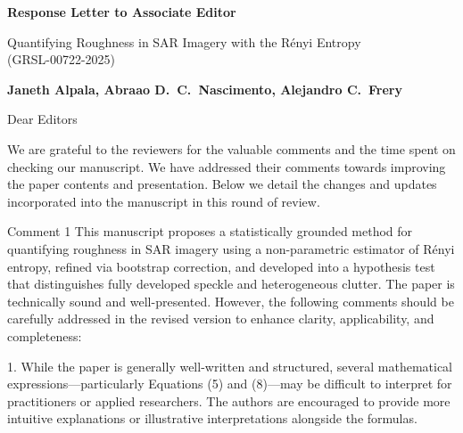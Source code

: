 \documentclass[11pt]{report}
\begin{document}
\begin{center}
\large{\textbf{Response Letter to Associate Editor}}

\vglue 0.3cm

\huge{ Quantifying Roughness in SAR Imagery with the Rényi Entropy\\ (GRSL-00722-2025)}
\end{center}

\begin{center}
\textbf{Janeth Alpala,   Abraao D.\ C.\ Nascimento, Alejandro C.\ Frery }
\end{center}

\date{\today}



\vspace{0.5cm}
\noindent Dear Editors
\bigskip

\noindent We are grateful to the reviewers for the valuable comments and the time spent on checking our manuscript. 
We have addressed their comments towards improving the paper contents and presentation. 
Below we detail the changes and updates incorporated into the manuscript in this round of review.

\medskip


\begin{reviewbox}{Comment 1}
This manuscript proposes a statistically grounded method for quantifying roughness in SAR imagery using a non-parametric estimator of Rényi entropy, refined via bootstrap correction, and developed into a hypothesis test that distinguishes fully developed speckle and heterogeneous clutter. The paper is technically sound and well-presented. However, the following comments should be carefully addressed in the revised version to enhance clarity, applicability, and completeness:


1. While the paper is generally well-written and structured, several mathematical expressions—particularly Equations (5) and (8)—may be difficult to interpret for practitioners or applied researchers. The authors are encouraged to provide more intuitive explanations or illustrative interpretations alongside the formulas.
\end{reviewbox}
\end{document}
